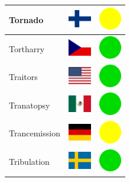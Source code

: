 \documentclass[12pt, a4paper, twoside]{report}
\begin{document}
\begin{center}
\begin{longtable}{|p{5cm}|p{2cm}|p{2cm}|}
			Tornado & \includegraphics[width=1cm]{4x3/fi} & \includegraphics[width=1cm]{likes/m} \\ \hline
			Tortharry & \includegraphics[width=1cm]{4x3/cz} & \includegraphics[width=1cm]{likes/y} \\ \hline
			Traitors & \includegraphics[width=1cm]{4x3/us} & \includegraphics[width=1cm]{likes/y} \\ \hline
			Tranatopsy & \includegraphics[width=1cm]{4x3/mx} & \includegraphics[width=1cm]{likes/y} \\ \hline
			Trancemission & \includegraphics[width=1cm]{4x3/de} & \includegraphics[width=1cm]{likes/m} \\ \hline
			Tribulation & \includegraphics[width=1cm]{4x3/se} & \includegraphics[width=1cm]{likes/y} \\ \hline

\end{longtable}
\end{center}
\end{document}
